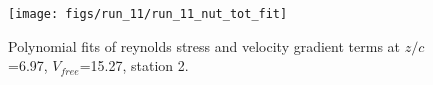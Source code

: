 \begin{figure}[H]
\centering
\texttt{[image: figs/run\_11/run\_11\_nut\_tot\_fit]}
\caption{Polynomial fits of reynolds stress and velocity gradient terms at $z/c$=6.97, $V_{free}$=15.27, station 2.}
\label{fig:run_11_nut_tot_fit}
\end{figure}


